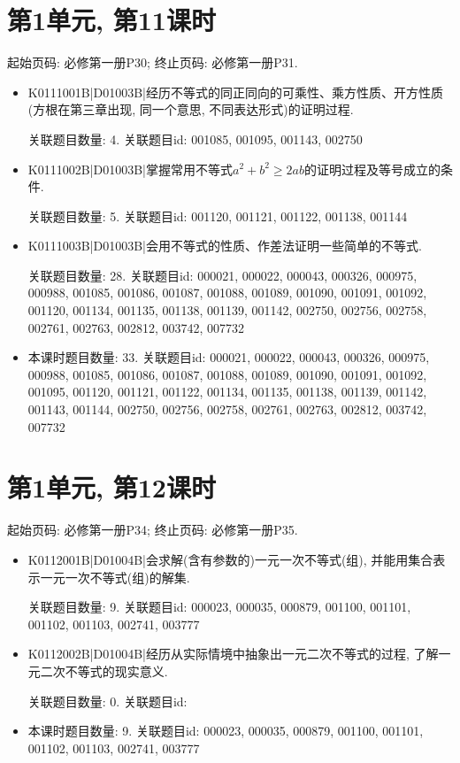 \section*{第1单元, 第11课时}
起始页码: 必修第一册P30; 终止页码: 必修第一册P31.
\begin{itemize}
\item K0111001B|D01003B|经历不等式的同正同向的可乘性、乘方性质、开方性质(方根在第三章出现, 同一个意思, 不同表达形式)的证明过程.

关联题目数量: 4. 关联题目id: 001085, 001095, 001143, 002750

\item K0111002B|D01003B|掌握常用不等式$a^2+b^2 \ge 2ab$的证明过程及等号成立的条件.

关联题目数量: 5. 关联题目id: 001120, 001121, 001122, 001138, 001144

\item K0111003B|D01003B|会用不等式的性质、作差法证明一些简单的不等式.

关联题目数量: 28. 关联题目id: 000021, 000022, 000043, 000326, 000975, 000988, 001085, 001086, 001087, 001088, 001089, 001090, 001091, 001092, 001120, 001134, 001135, 001138, 001139, 001142, 002750, 002756, 002758, 002761, 002763, 002812, 003742, 007732

\item 本课时题目数量: 33. 关联题目id: 000021, 000022, 000043, 000326, 000975, 000988, 001085, 001086, 001087, 001088, 001089, 001090, 001091, 001092, 001095, 001120, 001121, 001122, 001134, 001135, 001138, 001139, 001142, 001143, 001144, 002750, 002756, 002758, 002761, 002763, 002812, 003742, 007732

\end{itemize}

\section*{第1单元, 第12课时}
起始页码: 必修第一册P34; 终止页码: 必修第一册P35.
\begin{itemize}
\item K0112001B|D01004B|会求解(含有参数的)一元一次不等式(组), 并能用集合表示一元一次不等式(组)的解集.

关联题目数量: 9. 关联题目id: 000023, 000035, 000879, 001100, 001101, 001102, 001103, 002741, 003777

\item K0112002B|D01004B|经历从实际情境中抽象出一元二次不等式的过程, 了解一元二次不等式的现实意义.

关联题目数量: 0. 关联题目id: 

\item 本课时题目数量: 9. 关联题目id: 000023, 000035, 000879, 001100, 001101, 001102, 001103, 002741, 003777

\end{itemize}

